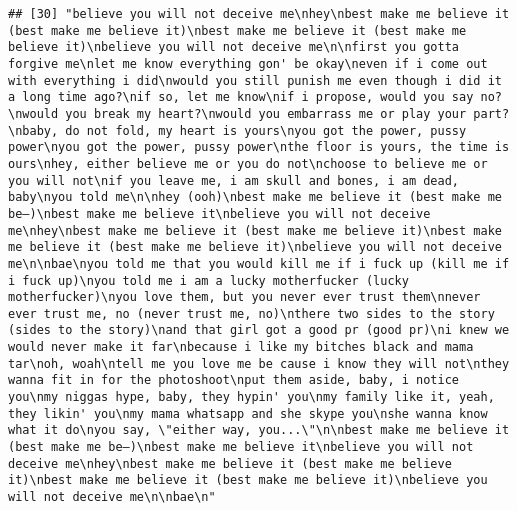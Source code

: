 \documentclass[]{article}
\begin{document}
\begin{verbatim}
## [30] "believe you will not deceive me\nhey\nbest make me believe it (best make me believe it)\nbest make me believe it (best make me believe it)\nbelieve you will not deceive me\n\nfirst you gotta forgive me\nlet me know everything gon' be okay\neven if i come out with everything i did\nwould you still punish me even though i did it a long time ago?\nif so, let me know\nif i propose, would you say no?\nwould you break my heart?\nwould you embarrass me or play your part?\nbaby, do not fold, my heart is yours\nyou got the power, pussy power\nyou got the power, pussy power\nthe floor is yours, the time is ours\nhey, either believe me or you do not\nchoose to believe me or you will not\nif you leave me, i am skull and bones, i am dead, baby\nyou told me\n\nhey (ooh)\nbest make me believe it (best make me be—)\nbest make me believe it\nbelieve you will not deceive me\nhey\nbest make me believe it (best make me believe it)\nbest make me believe it (best make me believe it)\nbelieve you will not deceive me\n\nbae\nyou told me that you would kill me if i fuck up (kill me if i fuck up)\nyou told me i am a lucky motherfucker (lucky motherfucker)\nyou love them, but you never ever trust them\nnever ever trust me, no (never trust me, no)\nthere two sides to the story (sides to the story)\nand that girl got a good pr (good pr)\ni knew we would never make it far\nbecause i like my bitches black and mama tar\noh, woah\ntell me you love me be cause i know they will not\nthey wanna fit in for the photoshoot\nput them aside, baby, i notice you\nmy niggas hype, baby, they hypin' you\nmy family like it, yeah, they likin' you\nmy mama whatsapp and she skype you\nshe wanna know what it do\nyou say, \"either way, you...\"\n\nbest make me believe it (best make me be—)\nbest make me believe it\nbelieve you will not deceive me\nhey\nbest make me believe it (best make me believe it)\nbest make me believe it (best make me believe it)\nbelieve you will not deceive me\n\nbae\n"                                                                                                                                                                                                                                                                                                                                                                                                                                                                                                                                                                                                                                                                                                                                                                                                                                                                                                                                                                                                                                                                                                                                                                                                                                                                                                                                                                                      
\end{verbatim}
\end{document}
